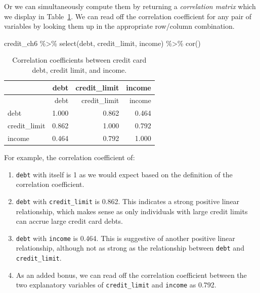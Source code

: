 \documentclass[
  letterpaper,
  DIV=11,
  numbers=noendperiod]{scrreprt}
\newenvironment{Shaded}{\begin{snugshade}}{\end{snugshade}}
\newcommand{\FunctionTok}[1]{\textcolor[rgb]{0.28,0.35,0.67}{#1}}
\newcommand{\NormalTok}[1]{\textcolor[rgb]{0.00,0.23,0.31}{#1}}
\newcommand{\SpecialCharTok}[1]{\textcolor[rgb]{0.37,0.37,0.37}{#1}}
\providecommand{\tightlist}{%
  \setlength{\itemsep}{0pt}\setlength{\parskip}{0pt}}\usepackage{longtable,booktabs,array}
\theoremstyle{definition}
\theoremstyle{remark}
\begin{document}
Or we can simultaneously compute them by returning a \emph{correlation
matrix} which we display in Table~\ref{tbl-model3-correlation}.
 We can read off the correlation
coefficient for any pair of variables by looking them up in the
appropriate row/column combination.

\begin{Shaded}
\begin{Highlighting}[]
\NormalTok{credit\_ch6 }\SpecialCharTok{\%\textgreater{}\%}
  \FunctionTok{select}\NormalTok{(debt, credit\_limit, income) }\SpecialCharTok{\%\textgreater{}\%} 
  \FunctionTok{cor}\NormalTok{()}
\end{Highlighting}
\end{Shaded}

\hypertarget{tbl-model3-correlation}{}
\begin{longtable}[]{@{}lrrr@{}}
\caption{\label{tbl-model3-correlation}Correlation coefficients between
credit card debt, credit limit, and income.}\tabularnewline
\toprule()
& debt & credit\_limit & income \\
\midrule()
\endfirsthead
\toprule()
& debt & credit\_limit & income \\
\midrule()
\endhead
debt & 1.000 & 0.862 & 0.464 \\
credit\_limit & 0.862 & 1.000 & 0.792 \\
income & 0.464 & 0.792 & 1.000 \\
\bottomrule()
\end{longtable}

For example, the correlation coefficient of:

\begin{enumerate}
\def\labelenumi{\arabic{enumi}.}
\tightlist
\item
  \texttt{debt} with itself is 1 as we would expect based on the
  definition of the correlation coefficient.
\item
  \texttt{debt} with \texttt{credit\_limit} is 0.862. This indicates a
  strong positive linear relationship, which makes sense as only
  individuals with large credit limits can accrue large credit card
  debts.
\item
  \texttt{debt} with \texttt{income} is 0.464. This is suggestive of
  another positive linear relationship, although not as strong as the
  relationship between \texttt{debt} and \texttt{credit\_limit}.
\item
  As an added bonus, we can read off the correlation coefficient between
  the two explanatory variables of \texttt{credit\_limit} and
  \texttt{income} as 0.792.
\end{enumerate}
\end{document}

